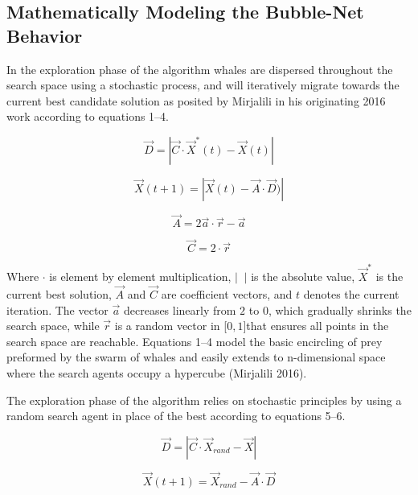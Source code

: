 \documentclass[11pt]{article}
\begin{document}
\subsection*{Mathematically Modeling the Bubble-Net Behavior} {
    In the exploration phase of the algorithm whales are dispersed throughout the search space using a stochastic process, and will iteratively migrate towards the current best candidate solution as posited by Mirjalili in his originating 2016 work according to equations 1--4.

    \begin{equation}
        \vec{D} = |\vec{C}\cdot\vec{X}^*(t) - \vec{X}(t)|
    \end{equation}

    \begin{equation}
        \vec{X}(t + 1) = |\vec{X}(t) - \vec{A}\cdot\vec{D})|
    \end{equation}

    \begin{equation}
        \vec{A} = 2\vec{a}\cdot\vec{r}-\vec{a}
    \end{equation}

    \begin{equation}
        \vec{C} = 2\cdot\vec{r}
    \end{equation}

    Where $\cdot$ is element by element multiplication, $| \;\; |$ is the absolute value, $\vec{X}^*$ is the current best solution, $\vec{A}$ and $\vec{C}$ are coefficient vectors, and $t$ denotes the current iteration.
    The vector $\vec{a}$ decreases linearly from $2$ to $0$, which gradually shrinks the search space, while $\vec{r}$ is a random vector in [$0,1]$that ensures all points in the search space are reachable.
    Equations 1--4 model the basic encircling of prey preformed by the swarm of whales and easily extends to n-dimensional space where the search agents occupy a hypercube (Mirjalili 2016).

    The exploration phase of the algorithm relies on stochastic principles by using a random search agent in place of the best according to equations 5--6.

    \begin{equation}
        \vec{D} = |\vec{C}\cdot\vec{X}_{rand} - \vec{X}|
    \end{equation}

    \begin{equation}
        \vec{X}(t+1) = \vec{X}_{rand} - \vec{A}\cdot\vec{D}
    \end{equation}

}
\end{document}
